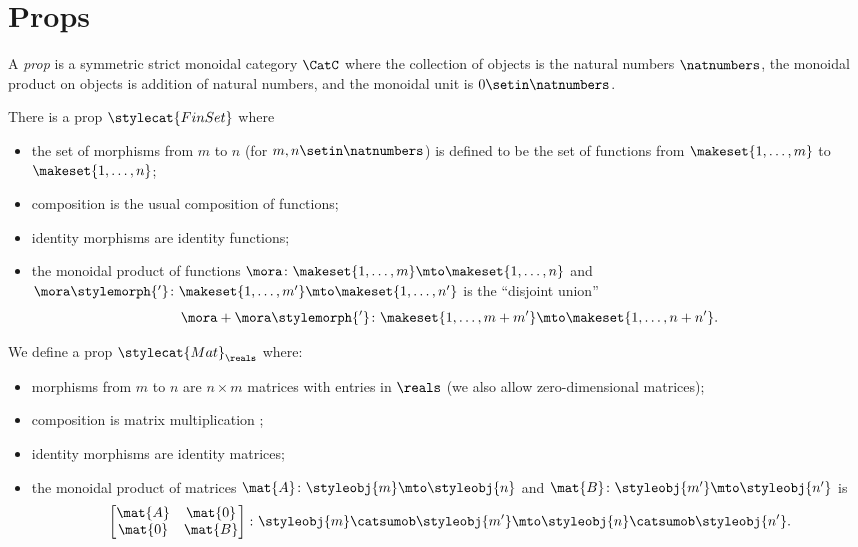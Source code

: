 \section{Props}

\begin{ctdefinition}\label{def:prop}
    A \emph{prop} is a symmetric strict monoidal category $\CatC$ where the collection of objects is the natural numbers $\natnumbers$, the monoidal product on objects is addition of natural numbers, and the monoidal unit is $0 \setin \natnumbers$.
\end{ctdefinition}

\begin{example}\label{exa:prop-finset}
    There is a prop $\stylecat{FinSet}$ where
    \begin{itemize}
        \item the set of morphisms from $m$ to $n$ (for $m, n \setin \natnumbers$) is defined to be the set of functions from $\makeset{1, \dots, m}$ to $\makeset{1, \dots, n}$;
        \item composition is the usual composition of functions;
        \item identity morphisms are identity functions;
        \item the monoidal product of functions $\mora \colon \makeset{1, \dots, m} \mto \makeset{1, \dots, n}$ and $\mora\stylemorph{'} \colon \makeset{1, \dots, m'} \mto \makeset{1, \dots, n'}$ is the ``disjoint union''
              \begin{equation}
                  \mora + \mora\stylemorph{'} \colon \makeset{1, \dots, m + m'} \mto \makeset{1, \dots, n + n'}.
              \end{equation}
    \end{itemize}
\end{example}

\begin{example}\label{exa:prop-mat}
    We define a prop $\stylecat{Mat}_\reals$ where:
    \begin{itemize}
        \item morphisms from $m$ to $n$ are $n \times m$ matrices with entries in $\reals$ (we also allow zero-dimensional matrices);
        \item composition is matrix multiplication ;
        \item identity morphisms are identity matrices;
        \item the monoidal product of matrices $\mat{A} \colon \styleobj{m} \mto \styleobj{n}$ and $\mat{B} \colon \styleobj{m'} \mto \styleobj{n'}$ is
              \begin{equation}
                  \begin{bmatrix}
                      \mat{A} & \mat{0} \\
                      \mat{0} & \mat{B}
                  \end{bmatrix}
                  \colon \styleobj{m} \catsumob \styleobj{m'} \mto \styleobj{n} \catsumob \styleobj{n'}.
              \end{equation}
    \end{itemize}
\end{example}


